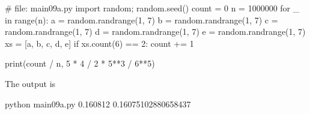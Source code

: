 \begin{console}[frame=single,fontsize=\footnotesize]
# file: main09a.py
import random; random.seed()
count = 0
n = 1000000
for _ in range(n):
    a = random.randrange(1, 7)
    b = random.randrange(1, 7)
    c = random.randrange(1, 7)
    d = random.randrange(1, 7)
    e = random.randrange(1, 7)
    xs = [a, b, c, d, e]
    if xs.count(6) == 2: 
        count += 1

print(count / n, 5 * 4 / 2 * 5**3 / 6**5)
\end{console}
The output is
\begin{console} python main09a.py
0.160812 0.16075102880658437
\end{console}

